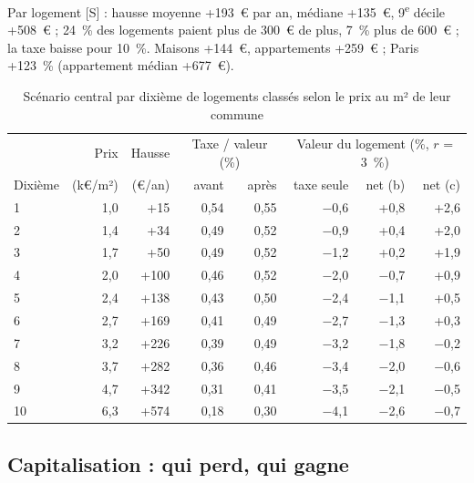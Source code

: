 Par logement [S] : hausse moyenne +193~€ par an, médiane +135~€,
9\textsuperscript{e} décile +508~€ ; 24~\% des logements paient plus de
300~€ de plus, 7~\% plus de 600~€ ; la taxe baisse pour 10~\%. Maisons
+144~€, appartements +259~€ ; Paris +123~\%
(appartement médian +677~€).

\begin{table}[!htbp]\centering\scriptsize
\caption{Scénario central par dixième de logements classés selon le prix au m² de leur commune}\label{tab:fon4_dec}
\setlength{\tabcolsep}{4pt}
\begin{tabular}{@{}lrrrrrrr@{}}
\toprule
 & Prix & Hausse & \multicolumn{2}{c}{Taxe / valeur (\%)} & \multicolumn{3}{c}{Valeur du logement (\%, $r$ = 3~\%)} \\
\cmidrule(lr){4-5}\cmidrule(l){6-8}
Dixième & (k€/m²) & (€/an) & avant & après & taxe seule & net (b) & net (c) \\
\midrule
1 & 1,0 & +15 & 0,54 & 0,55 & $-$0,6 & +0,8 & +2,6 \\
2 & 1,4 & +34 & 0,49 & 0,52 & $-$0,9 & +0,4 & +2,0 \\
3 & 1,7 & +50 & 0,49 & 0,52 & $-$1,2 & +0,2 & +1,9 \\
4 & 2,0 & +100 & 0,46 & 0,52 & $-$2,0 & $-$0,7 & +0,9 \\
5 & 2,4 & +138 & 0,43 & 0,50 & $-$2,4 & $-$1,1 & +0,5 \\
6 & 2,7 & +169 & 0,41 & 0,49 & $-$2,7 & $-$1,3 & +0,3 \\
7 & 3,2 & +226 & 0,39 & 0,49 & $-$3,2 & $-$1,8 & $-$0,2 \\
8 & 3,7 & +282 & 0,36 & 0,46 & $-$3,4 & $-$2,0 & $-$0,6 \\
9 & 4,7 & +342 & 0,31 & 0,41 & $-$3,5 & $-$2,1 & $-$0,5 \\
10 & 6,3 & +574 & 0,18 & 0,30 & $-$4,1 & $-$2,6 & $-$0,7 \\
\bottomrule
\end{tabular}
\par\vspace{2pt}{\raggedright\scriptsize Prix : médiane du dixième. Taxe / valeur avant capitalisation (figure g4).
Valeur : effet de la seule taxe, puis effet net de la baisse des droits selon les hypothèses (b) et (c) de la
section suivante, en \% de la valeur du modèle (prix DVF).\par}
\end{table}

\subsection{Capitalisation : qui perd, qui gagne}

